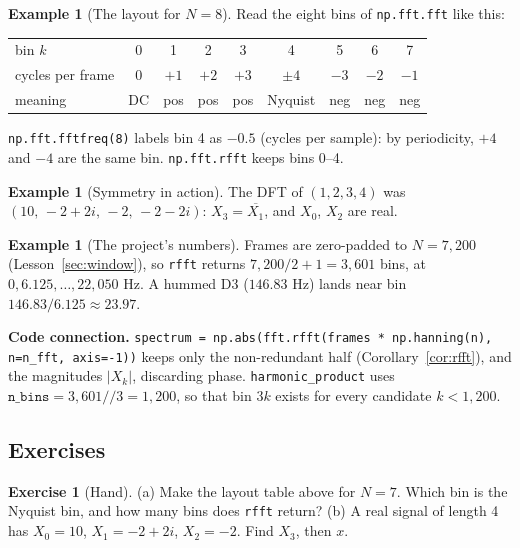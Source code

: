 \documentclass[11pt]{article}
\theoremstyle{definition}
\newtheorem{example}[theorem]{Example}
\newtheorem{innerexercise}{Exercise}[section]
\newenvironment{exercise}[1][]{\begin{innerexercise}[#1]}{\end{innerexercise}}
\newcommand{\abs}[1]{\lvert #1\rvert}
\newcommand{\code}[1]{\texttt{#1}}
\begin{document}
\begin{example}[The layout for $N=8$]
Read the eight bins of \code{np.fft.fft} like this:
\begin{center}
\small
\begin{tabular}{@{}lcccccccc@{}}
\toprule
bin $k$ & 0 & 1 & 2 & 3 & 4 & 5 & 6 & 7\\
cycles per frame & 0 & $+1$ & $+2$ & $+3$ & $\pm4$ & $-3$ & $-2$ & $-1$\\
meaning & DC & pos & pos & pos & Nyquist & neg & neg & neg\\
\bottomrule
\end{tabular}
\end{center}
\code{np.fft.fftfreq(8)} labels bin 4 as $-0.5$ (cycles per sample): by periodicity,
$+4$ and $-4$ are the same bin. \code{np.fft.rfft} keeps bins 0--4.
\end{example}

\begin{example}[Symmetry in action]
The DFT of $(1,2,3,4)$ was $(10,\,-2+2i,\,-2,\,-2-2i)$: $X_3=\overline{X_1}$, and
$X_0$, $X_2$ are real.
\end{example}

\begin{example}[The project's numbers]
Frames are zero-padded to $N=7{,}200$ (Lesson~\ref{sec:window}), so \code{rfft}
returns $7{,}200/2+1=3{,}601$ bins, at $0,6.125,\dots,22{,}050$ Hz. A hummed D3
($146.83$ Hz) lands near bin $146.83/6.125\approx23.97$.
\end{example}

\begin{connection}
\textbf{Code connection.} \code{spectrum = np.abs(fft.rfft(frames * np.hanning(n),
n=n\_fft, axis=-1))} keeps only the non-redundant half (Corollary~\ref{cor:rfft}),
and the magnitudes $\abs{X_k}$, discarding phase. \code{harmonic\_product} uses
$\code{n\_bins} = 3{,}601 /\!/ 3 = 1{,}200$, so that bin $3k$ exists for every
candidate $k<1{,}200$.
\end{connection}

\subsection{Exercises}
\begin{exercise}[Hand]\label{ex:layout7}
(a) Make the layout table above for $N=7$. Which bin is the Nyquist bin, and how many
bins does \code{rfft} return? (b) A real signal of length 4 has $X_0=10$, $X_1=-2+2i$,
$X_2=-2$. Find $X_3$, then $x$.
\end{exercise}
\end{document}

